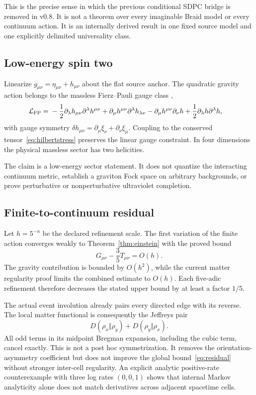\documentclass[11pt]{article}
\theoremstyle{definition}
\theoremstyle{remark}
\begin{document}
This is the precise sense in which the previous conditional SDPC bridge is removed in v0.8. It is not a theorem over every imaginable Braid model or every continuum action. It is an internally derived result in one fixed source model and one explicitly delimited universality class.

\subsection{Low-energy spin two}

Linearize $g_{\mu\nu}=\eta_{\mu\nu}+h_{\mu\nu}$ about the flat source anchor. The quadratic gravity action belongs to the massless Fierz--Pauli gauge class \cite{fierzpauli1939},
\begin{align}
 \mathcal L_{\rm FP}={}&
 -\frac12\partial_{\lambda}h_{\mu\nu}\partial^{\lambda}h^{\mu\nu}
 +\partial_{\mu}h^{\mu\nu}\partial^{\lambda}h_{\lambda\nu}
 -\partial_{\mu}h^{\mu\nu}\partial_{\nu}h
 +\frac12\partial_{\lambda}h\partial^{\lambda}h,
\end{align}
with gauge symmetry $\delta h_{\mu\nu}=\partial_{\mu}\xi_{\nu}+\partial_{\nu}\xi_{\mu}$. Coupling to the conserved tensor~\eqref{eq:hilbertstress} preserves the linear gauge constraint. In four dimensions the physical massless sector has two helicities.

The claim is a low-energy sector statement. It does not quantize the interacting continuum metric, establish a graviton Fock space on arbitrary backgrounds, or prove perturbative or nonperturbative ultraviolet completion.

\subsection{Finite-to-continuum residual}

Let $h=5^{-n}$ be the declared refinement scale. The first variation of the finite action converges weakly to Theorem~\ref{thm:einstein} with the proved bound
\begin{equation}\label{eq:residual}
 G_{\mu\nu}-\frac35T_{\mu\nu}=O(h).
\end{equation}
The gravity contribution is bounded by $O(h^2)$, while the current matter regularity proof limits the combined estimate to $O(h)$. Each five-adic refinement therefore decreases the stated upper bound by at least a factor $1/5$.

The actual event involution already pairs every directed edge with its reverse. The local matter functional is consequently the Jeffreys pair
\begin{equation}
 D(\rho_x\Vert\rho_y)+D(\rho_y\Vert\rho_x).
\end{equation}
All odd terms in its midpoint Bregman expansion, including the cubic term, cancel exactly. This is not a post hoc symmetrization. It removes the orientation-asymmetry coefficient but does not improve the global bound~\eqref{eq:residual} without stronger inter-cell regularity. An explicit analytic positive-rate counterexample with three log rates $(0,0,1)$ shows that internal Markov analyticity alone does not match derivatives across adjacent spacetime cells.
\end{document}
